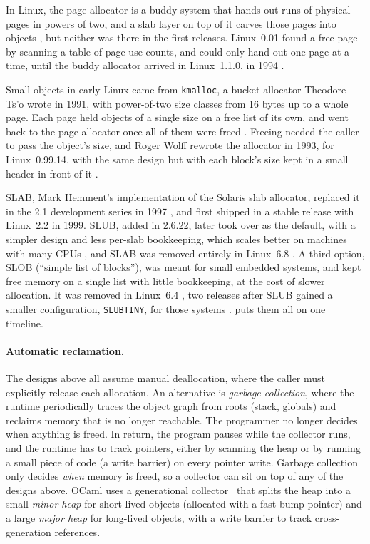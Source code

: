 \documentclass[12pt]{report}
\renewcommand{\_}{\origunderscore\allowbreak}
\begin{document}
In Linux, the page allocator is a buddy system that hands out runs of physical pages in powers of two, and a slab layer on top of it carves those pages into objects \cite{gorman2004vmm}, but neither was there in the first releases. Linux~0.01 found a free page by scanning a table of page use counts, and could only hand out one page at a time, until the buddy allocator arrived in Linux~1.1.0, in 1994 \cite{linux-1.1.0-diff}.

Small objects in early Linux came from \texttt{kmalloc}, a bucket allocator Theodore Ts'o wrote in 1991, with power-of-two size classes from 16 bytes up to a whole page. Each page held objects of a single size on a free list of its own, and went back to the page allocator once all of them were freed \cite{linux-0.11-source}. Freeing needed the caller to pass the object's size, and Roger Wolff rewrote the allocator in 1993, for Linux~0.99.14, with the same design but with each block's size kept in a small header in front of it \cite{linux-1.0-source}.



SLAB, Mark Hemment's implementation of the Solaris slab allocator, replaced it in the 2.1 development series in 1997 \cite{linux-2.1.23-patch}, and first shipped in a stable release with Linux~2.2 in 1999. SLUB, added in 2.6.22, later took over as the default, with a simpler design and less per-slab bookkeeping, which scales better on machines with many CPUs \cite{corbet2007slub}, and SLAB was removed entirely in Linux~6.8 \cite{kernelnewbies-linux68}. A third option, SLOB (``simple list of blocks''), was meant for small embedded systems, and kept free memory on a single list with little bookkeeping, at the cost of slower allocation. It was removed in Linux~6.4 \cite{kernelnewbies-linux64}, two releases after SLUB gained a smaller configuration, \texttt{SLUB\_TINY}, for those systems \cite{kernelnewbies-linux62}.  puts them all on one timeline.

\paragraph{Automatic reclamation.} The designs above all assume manual deallocation, where the caller must explicitly release each allocation. An alternative is \emph{garbage collection}, where the runtime periodically traces the object graph from roots (stack, globals) and reclaims memory that is no longer reachable. The programmer no longer decides when anything is freed. In return, the program pauses while the collector runs, and the runtime has to track pointers, either by scanning the heap or by running a small piece of code (a write barrier) on every pointer write. Garbage collection only decides \emph{when} memory is freed, so a collector can sit on top of any of the designs above. OCaml uses a generational collector~\cite{doligez1993gc} that splits the heap into a small \emph{minor heap} for short-lived objects (allocated with a fast bump pointer) and a large \emph{major heap} for long-lived objects, with a write barrier to track cross-generation references.
\end{document}

